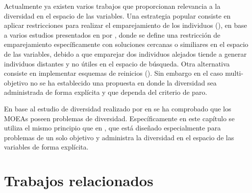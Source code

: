 %
Actualmente ya existen varios trabajos que proporcionan relevancia a la diversidad en el espacio de las variables. %
%
Una estrategia popular consiste en aplicar restricciones para realizar el emparejamiento de los individuos (\cite{Joel:MOEAD_AMS}), en base a varios estudios presentados en  por \citeauthor{Joel:STUDY_MATTING_RESTRICTION}, donde se define una restricción de emparejamiento específicamente con soluciones cercanas o similiares en el espacio de las variables, debido a que emparejar dos individuos alejados tiende a generar individuos distantes y no útiles en el espacio de búsqueda.
%
Otra alternativa consiste en implementar esquemas de reinicios (\cite{ joel:jaeggi2008development, Joel:Improved_Multiobjective_Diversity_Control_Oriented_Genetic_Algorithm}).
%
Sin embargo en el caso multi-objetivo no se ha establecido una propuesta en donde la diversidad sea administrada de forma explícita y que dependa del criterio de paro.
%


En base al estudio de diversidad realizado por \citeauthor{Joel:GECCO17} en  se ha comprobado que los MOEAs poseen problemas de diversidad.
%
Específicamente en este capítulo se utiliza el mismo principio que en \citeauthor{Joel:MULTI_DYNAMIC}, que está diseñado especialmente para problemas de un solo objetivo y administra la diversidad en el espacio de las variables de forma explícita. 

\section{Trabajos relacionados}

